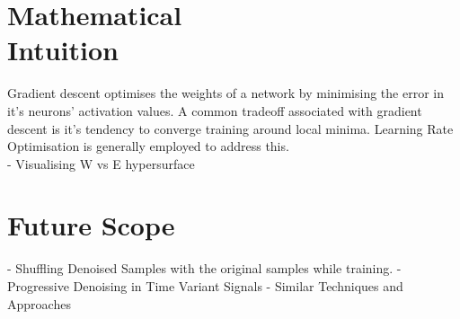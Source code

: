 \documentclass[12pt]{article}
\begin{document}
\begin{multicols}{2}
		\section{Mathematical \\Intuition}
		Gradient descent optimises the weights of a network by minimising the error in it's neurons' activation values. A common tradeoff associated with gradient descent is it's tendency to converge training around local minima. Learning Rate Optimisation is generally employed to address this.
		\\
		- Visualising W vs E hypersurface

		\section{Future Scope}
		- Shuffling Denoised Samples with the original samples while training.
		- Progressive Denoising in Time Variant Signals
		- Similar Techniques and Approaches
		
	\end{multicols}

	\begin{multicols}{2}
		
	\end{multicols}
	
	
	
	
	
\end{document}
